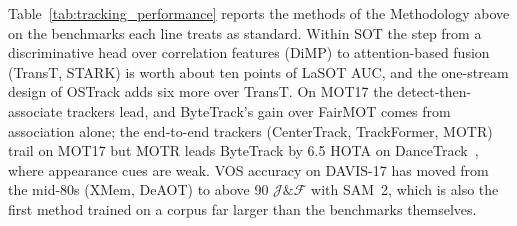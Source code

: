 Table~\ref{tab:tracking_performance} reports the methods of the Methodology above on the benchmarks each line treats as standard. Within SOT the step from a discriminative head over correlation features (DiMP) to attention-based fusion (TransT, STARK) is worth about ten points of LaSOT AUC, and the one-stream design of OSTrack adds six more over TransT. On MOT17 the detect-then-associate trackers lead, and ByteTrack's gain over FairMOT comes from association alone; the end-to-end trackers (CenterTrack, TrackFormer, MOTR) trail on MOT17 but MOTR leads ByteTrack by 6.5 HOTA on DanceTrack~\cite{zeng2022motr}, where appearance cues are weak. VOS accuracy on DAVIS-17 has moved from the mid-80s (XMem, DeAOT) to above 90 $\mathcal{J}\&\mathcal{F}$ with SAM~2, which is also the first method trained on a corpus far larger than the benchmarks themselves.

